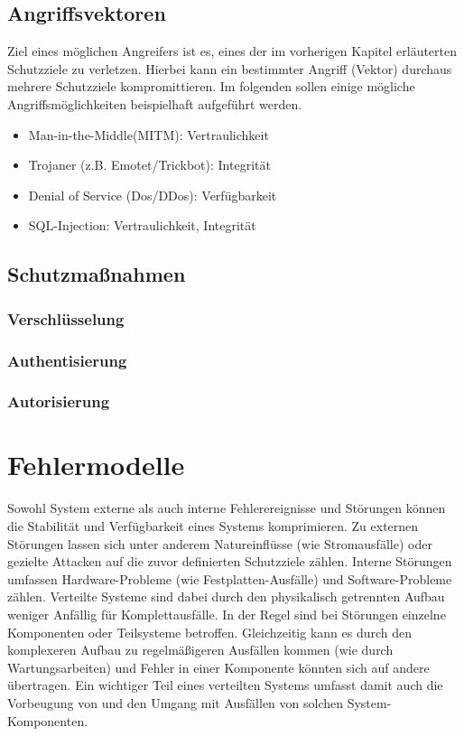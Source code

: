 \documentclass[12pt,a4paper,parskip=half]{scrreprt}
\begin{document}
	
	\section{Angriffsvektoren}
	
	Ziel eines möglichen Angreifers ist es, eines der im vorherigen Kapitel erläuterten Schutzziele zu verletzen. Hierbei kann ein bestimmter Angriff (Vektor) durchaus mehrere Schutzziele kompromittieren. Im folgenden sollen einige mögliche Angriffsmöglichkeiten beispielhaft aufgeführt werden.
	
	\begin{itemize}
		\item Man-in-the-Middle(MITM): Vertraulichkeit
		\item Trojaner (z.B. Emotet/Trickbot): Integrität
		\item Denial of Service (Dos/DDos): Verfügbarkeit
		\item SQL-Injection: Vertraulichkeit, Integrität
	\end{itemize}
	
	
	
	\section{Schutzmaßnahmen}
	
	
	\subsection{Verschlüsselung}
	
	
	\subsection{Authentisierung}
	
	
	\subsection{Autorisierung}
	
	
	\chapter{Fehlermodelle}
	Sowohl System externe als auch interne Fehlerereignisse und Störungen können die Stabilität und Verfügbarkeit eines Systems komprimieren. Zu externen Störungen lassen sich unter anderem Natureinflüsse (wie Stromausfälle) oder gezielte Attacken auf die zuvor definierten Schutzziele zählen. Interne Störungen umfassen Hardware-Probleme (wie Festplatten-Ausfälle) und Software-Probleme zählen. Verteilte Systeme sind dabei durch den physikalisch getrennten Aufbau weniger Anfällig für Komplettausfälle. In der Regel sind bei Störungen einzelne Komponenten oder Teilsysteme betroffen. Gleichzeitig kann es durch den komplexeren Aufbau zu regelmäßigeren Ausfällen kommen (wie durch Wartungsarbeiten) und Fehler in einer Komponente könnten sich auf andere übertragen. Ein wichtiger Teil eines verteilten Systems umfasst damit auch die Vorbeugung von und den Umgang mit Ausfällen von solchen System-Komponenten.
	
\end{document}
